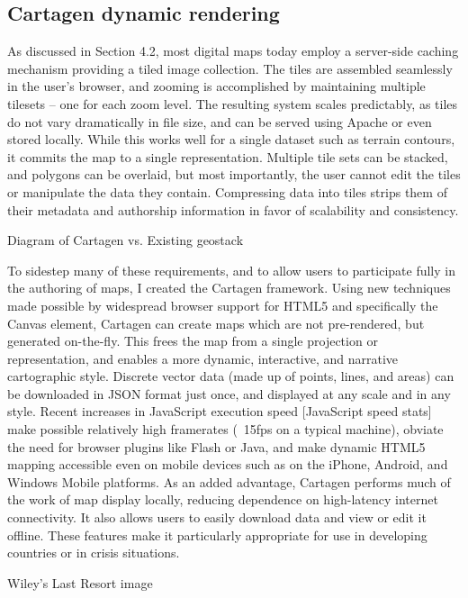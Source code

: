 \documentclass[11pt]{report}
\begin{document}
\subsection{Cartagen dynamic rendering}

As discussed in Section 4.2, most digital maps today employ a server-side caching mechanism providing a tiled image collection. The tiles are assembled seamlessly in the user's browser, and zooming is accomplished by maintaining multiple tilesets -- one for each zoom level. The resulting system scales predictably, as tiles do not vary dramatically in file size, and can be served using Apache or even stored locally. While this works well for a single dataset such as terrain contours, it commits the map to a single representation. Multiple tile sets can be stacked, and polygons can be overlaid, but most importantly, the user cannot edit the tiles or manipulate the data they contain. Compressing data into tiles strips them of their metadata and authorship information in favor of scalability and consistency. 

Diagram of Cartagen vs. Existing geostack

To sidestep many of these requirements, and to allow users to participate fully in the authoring of maps, I created the Cartagen framework. Using new techniques made possible by widespread browser support for HTML5 and specifically the Canvas element, Cartagen can create maps which are not pre-rendered, but generated on-the-fly. This frees the map from a single projection or representation, and enables a more dynamic, interactive, and narrative cartographic style. Discrete vector data (made up of points, lines, and areas) can be downloaded in JSON format just once, and displayed at any scale and in any style. Recent increases in JavaScript execution speed [JavaScript speed stats] make possible relatively high framerates (~15fps on a typical machine), obviate the need for browser plugins like Flash or Java, and make dynamic HTML5 mapping accessible even on mobile devices such as on the iPhone, Android, and Windows Mobile platforms. As an added advantage, Cartagen performs much of the work of map display locally, reducing dependence on high-latency internet connectivity. It also allows users to easily download data and view or edit it offline. These features make it particularly appropriate for use in developing countries or in crisis situations. 

Wiley's Last Resort image
\end{document}
